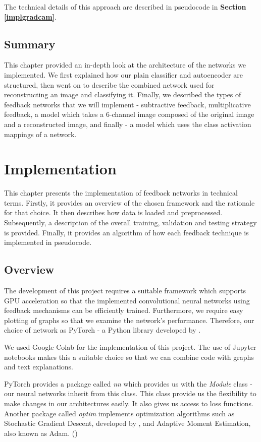 \documentclass{l4proj}
\begin{document}
The technical details of this approach are described in pseudocode in \textbf{Section \ref{implgradcam}}.

\section{Summary}
This chapter provided an in-depth look at the architecture of the networks we implemented. We first explained how our plain classifier and autoencoder are structured, then went on to describe the combined network used for reconstructing an image and classifying it. Finally, we described the types of feedback networks that we will implement - subtractive feedback, multiplicative feedback, a model which takes a 6-channel image composed of the original image and a reconstructed image, and finally - a model which uses the class activation mappings of a network.

\chapter{Implementation}
\label{chap:implementation}
This chapter presents the implementation of feedback networks in technical terms. Firstly, it provides an overview of the chosen framework and the rationale for that choice. It then describes how data is loaded and preprocessed.  Subsequently, a description of the overall training, validation and testing strategy is provided. Finally, it provides an algorithm of how each feedback technique is implemented in pseudocode.

\section{Overview}
The development of this project requires a suitable framework which supports GPU acceleration so that the implemented convolutional neural networks using feedback mechanisms can be efficiently trained. Furthermore, we require easy plotting of graphs so that we examine the network's performance. Therefore, our choice of network as PyTorch - a Python library developed by \cite{pytorch}. 

We used Google Colab for the implementation of this project. The use of Jupyter notebooks makes this a suitable choice so that we can combine code with graphs and text explanations. 


PyTorch provides a package called \textit{nn} which provides us with the \textit{Module} class - our neural networks inherit from this class. This class provide us the flexibility to make changes in our architectures easily. It also gives us access to loss functions. Another package called \textit{optim} implements optimization algorithms such as Stochastic Gradient Descent, developed by \cite{SGD}, and Adaptive Moment Estimation, also known as Adam. (\cite{adam})
\end{document}
